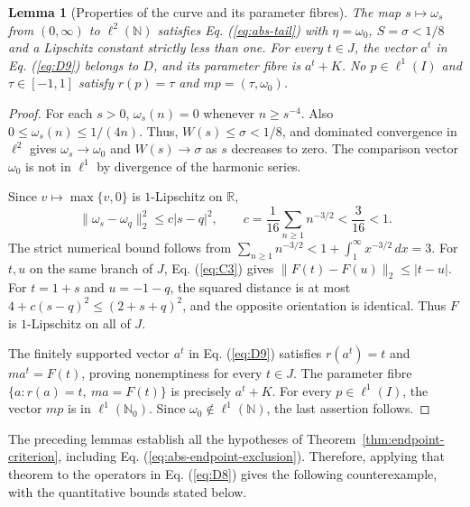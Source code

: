 \documentclass[11pt]{article}
\newcommand{\R}{\mathbb R}
\newcommand{\N}{\mathbb N}
\newcommand{\Nzero}{\mathbb N_0}
\newtheorem{lemma}{Lemma}
\theoremstyle{definition}
\theoremstyle{remark}
\begin{document}
\begin{lemma}[Properties of the curve and its parameter fibres]
\label{lem:coordinate-profile}
The map $s\mapsto\omega_s$ from $(0,\infty)$ to $\ell^2(\N)$ satisfies Eq. (\ref{eq:abs-tail}) with $\eta=\omega_0$, $S=\sigma<1/8$ and a Lipschitz constant strictly less than one. For every $t\in J$, the vector $a^t$ in Eq. (\ref{eq:D9}) belongs to $D$, and its parameter fibre is $a^t+K$. No $p\in\ell^1(I)$ and $\tau\in[-1,1]$ satisfy $r(p)=\tau$ and $mp=(\tau,\omega_0)$.
\end{lemma}
\begin{proof}
\label{sec:C2}
For each $s>0$, $\omega_s(n)=0$ whenever $n\ge s^{-4}$. Also $0\le\omega_s(n)\le1/(4n)$. Thus, $W(s)\le\sigma<1/8$, and dominated convergence in $\ell^2$ gives $\omega_s\to\omega_0$ and $W(s)\to\sigma$ as $s$ decreases to zero. The comparison vector $\omega_0$ is not in $\ell^1$ by divergence of the harmonic series.

Since $v\mapsto\max\{v,0\}$ is $1$-Lipschitz on $\R$,
\begin{equation}
\|\omega_s-\omega_q\|_2^2\le c|s-q|^2,\qquad
c=\frac1{16}\sum_{n\ge1}n^{-3/2}<\frac3{16}<1.
\label{eq:C3}
\end{equation}
The strict numerical bound follows from $\sum_{n\ge1}n^{-3/2}<1+\int_1^\infty x^{-3/2}\,dx=3$. For $t,u$ on the same branch of $J$, Eq. (\ref{eq:C3}) gives $\|F(t)-F(u)\|_2\le|t-u|$. For $t=1+s$ and $u=-1-q$, the squared distance is at most $4+c(s-q)^2\le(2+s+q)^2$, and the opposite orientation is identical. Thus $F$ is $1$-Lipschitz on all of $J$.

The finitely supported vector $a^t$ in Eq. (\ref{eq:D9}) satisfies $r(a^t)=t$ and $ma^t=F(t)$, proving nonemptiness for every $t\in J$. The parameter fibre $\{a:r(a)=t,\ ma=F(t)\}$ is precisely $a^t+K$. For every $p\in\ell^1(I)$, the vector $mp$ is in $\ell^1(\Nzero)$. Since $\omega_0\notin\ell^1(\N)$, the last assertion follows.
\end{proof}


The preceding lemmas establish all the hypotheses of Theorem~\ref{thm:endpoint-criterion}, including Eq. (\ref{eq:abs-endpoint-exclusion}). Therefore, applying that theorem to the operators in Eq. (\ref{eq:D8}) gives the following counterexample, with the quantitative bounds stated below.
\end{document}
